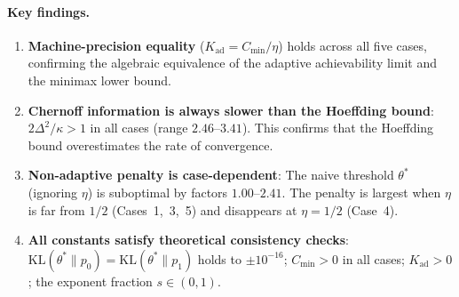 \paragraph{Key findings.}
\begin{enumerate}
    \item \textbf{Machine-precision equality} ($K_{\mathrm{ad}} = C_{\min}/\eta$) holds across all five cases, confirming the algebraic equivalence of the adaptive achievability limit and the minimax lower bound.
    \item \textbf{Chernoff information is always slower than the Hoeffding bound}: $2\Delta^2 / \kappa > 1$ in all cases (range $2.46$--$3.41$). This confirms that the Hoeffding bound overestimates the rate of convergence.
    \item \textbf{Non-adaptive penalty is case-dependent}: The naive threshold $\theta^*$ (ignoring $\eta$) is suboptimal by factors $1.00$--$2.41$. The penalty is largest when $\eta$ is far from $1/2$ (Cases~1,~3,~5) and disappears at $\eta = 1/2$ (Case~4).
    \item \textbf{All constants satisfy theoretical consistency checks}: $\mathrm{KL}(\theta^*\|p_0) = \mathrm{KL}(\theta^*\|p_1)$ holds to $\pm 10^{-16}$; $C_{\min} > 0$ in all cases; $K_{\mathrm{ad}} > 0$; the exponent fraction $s \in (0,1)$.
\end{enumerate}
